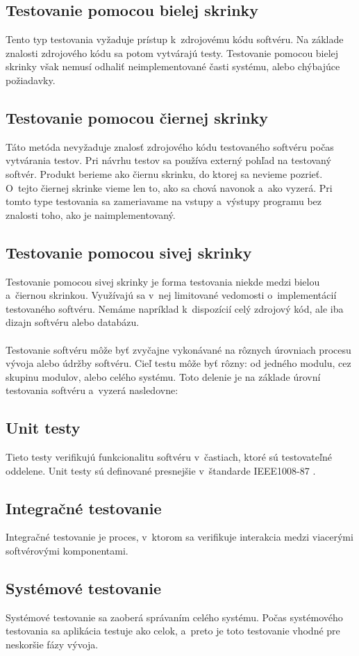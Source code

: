 \subsection*{Testovanie pomocou bielej skrinky}
Tento typ testovania vyžaduje prístup k~zdrojovému kódu softvéru. Na základe znalosti zdrojového kódu sa potom vytvárajú testy.
Testovanie pomocou bielej skrinky však nemusí odhaliť neimplementované časti systému, alebo chýbajúce požiadavky.
\subsection*{Testovanie pomocou čiernej skrinky} \label{sekcia:cierna_skrinka}
Táto metóda nevyžaduje znalosť zdrojového kódu testovaného softvéru počas vytvárania testov.
Pri návrhu testov sa používa externý pohľad na testovaný softvér. 
Produkt berieme ako čiernu skrinku, do ktorej sa nevieme pozrieť.
O~tejto čiernej skrinke vieme len to, ako sa chová navonok a~ako vyzerá.
Pri tomto type testovania sa zameriavame na vstupy a~výstupy programu bez znalosti toho, ako je naimplementovaný.
\subsection*{Testovanie pomocou sivej skrinky}
Testovanie pomocou sivej skrinky je forma testovania niekde medzi bielou a~čiernou skrinkou. 
Využívajú sa v~nej limitované vedomosti o~implementácií testovaného softvéru.
Nemáme napríklad k~dispozícií celý zdrojový kód, ale iba dizajn softvéru alebo databázu.
\\
\\
Testovanie softvéru môže byť zvyčajne vykonávané na rôznych úrovniach 
procesu vývoja alebo údržby softvéru. Cieľ testu môže byť rôzny: od jedného
modulu, cez skupinu modulov, alebo celého systému.
Toto delenie je na základe úrovní testovania softvéru a~vyzerá nasledovne:
\subsection*{Unit testy}
Tieto testy verifikujú funkcionalitu softvéru v~častiach, ktoré sú testovateľné oddelene.
Unit testy sú definované presnejšie v~štandarde IEEE1008-87 \cite{Ieee_unit}.
\subsection*{Integračné testovanie}
Integračné testovanie je proces, v~ktorom sa verifikuje interakcia medzi viacerými softvérovými komponentami.
\subsection*{Systémové testovanie}
Systémové testovanie sa zaoberá správaním celého systému. Počas systémového testovania sa aplikácia testuje ako celok,
a~preto je toto testovanie vhodné pre neskoršie fázy vývoja.
